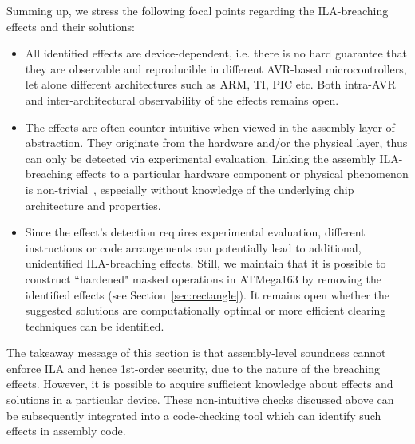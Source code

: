 Summing up, we stress the following focal points regarding the ILA-breaching effects and their solutions:
\begin{itemize}
\item All identified effects are device-dependent, i.e. there is no hard guarantee that they are observable and reproducible in different AVR-based microcontrollers, let alone different architectures such as ARM, TI, PIC etc. Both intra-AVR and inter-architectural observability of the effects remains open.
\item The effects are often counter-intuitive when viewed in the assembly layer of abstraction. They originate from the hardware and/or the physical layer, thus can only be detected via experimental evaluation. Linking the assembly ILA-breaching effects to a particular hardware component or physical phenomenon is non-trivial~\cite{DBLP:conf/eurocrypt/RenauldSVKF11,DBLP:phd/dnb/Stottinger12}, especially without knowledge of the underlying chip architecture and properties.
\item  Since the effect's detection requires experimental evaluation, different instructions or code arrangements can potentially lead to additional, unidentified ILA-breaching effects. Still, we maintain that it is possible to construct ``hardened" masked operations in ATMega163 by removing the identified effects (see Section~\ref{sec:rectangle}). It remains open whether the suggested solutions are computationally optimal or more efficient clearing techniques can be identified.
\end{itemize}

The takeaway message of this section is that assembly-level soundness cannot enforce ILA and hence 1st-order security, due to the nature of the breaching effects. However, it is possible to acquire sufficient knowledge about effects and solutions in a particular device. These non-intuitive checks discussed above can be subsequently integrated into a code-checking tool which can identify such effects in assembly code.
